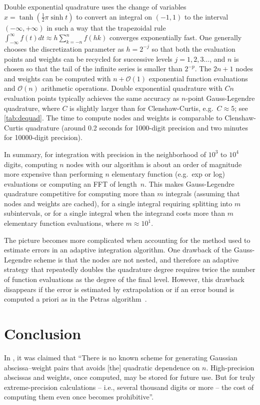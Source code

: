 \documentclass[nohypdvips,review]{siamart0216}
\newcommand{\OO}{\mathcal{O}}
\begin{document}
Double exponential quadrature uses the change of variables
$x = \tanh(\tfrac12 \pi \sinh t)$ to convert an integral on $(-1,1)$
to the interval $(-\infty,+\infty)$ in such a way that
the trapezoidal rule $\int_{-\infty}^{\infty} f(t) dt \approx h \sum_{k=-n}^{n} f(hk)$
converges exponentially fast.
One generally chooses the discretization parameter as $h = 2^{-j}$ so that
both the evaluation points and weights can be recycled for successive levels
$j = 1, 2, 3\ldots$, and $n$ is chosen so that the tail of the
infinite series is smaller than $2^{-p}$.
The $2n+1$ nodes and weights can be computed with $n + \OO(1)$
exponential function evaluations and $\OO(n)$ arithmetic operations.
Double exponential quadrature with $Cn$ evaluation points
typically achieves the same accuracy as $n$-point Gauss-Legendre quadrature,
where $C$ is slightly larger than
for Clenshaw-Curtis, e.g.\ $C \approx 5$; see \cref{tab:dequad}.
The time to compute nodes and weights is comparable
to Clenshaw-Curtis quadrature (around 0.2 seconds for 1000-digit
precision and two minutes for 10000-digit precision).

In summary, for integration
with precision in the neighborhood of $10^3$ to $10^4$ digits,
computing $n$ nodes with our algorithm is about an
order of magnitude more expensive than performing $n$ elementary function (e.g.\ exp or log)
evaluations or computing an FFT of length~$n$.
This makes Gauss-Legendre quadrature competitive for computing more than $m$
integrals (assuming that nodes and weights are cached),
for a single integral requiring splitting into $m$ subintervals,
or for a single integral when the integrand costs more than $m$ elementary
function evaluations, where $m \approx 10^1$.

The picture becomes more complicated when accounting for the method
used to estimate errors in an adaptive integration algorithm.
One drawback of the Gauss-Legendre scheme is that the nodes
are not nested, and therefore an adaptive strategy that
repeatedly doubles the quadrature degree
requires twice the number of function evaluations as
the degree of the final level.
However, this drawback disappears if the
error is estimated by extrapolation or if an error bound is computed
a priori as in the Petras algorithm~\cite{petras2002self}.

\section{Conclusion}

In \cite{bailey2011high}, it was claimed that
``There is no known scheme for generating Gaussian abscissa--weight pairs
that avoids [the] quadratic dependence
on $n$. High-precision abscissas
and weights, once computed, may be stored for future use. But for truly
extreme-precision calculations -- i.e., several thousand digits or
more -- the cost of computing them
even once becomes prohibitive''.
\end{document}
